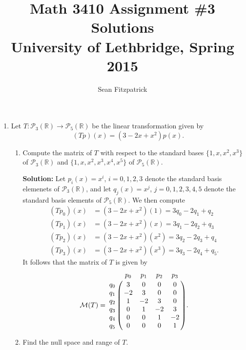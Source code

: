 \documentclass[letterpaper,12pt]{article}
\title{Math 3410 Assignment \#3 Solutions\\University of Lethbridge, Spring 2015}
\author{Sean Fitzpatrick}
\newcommand{\R}{\mathbb{R}}
\renewcommand{\P}{\mathcal{P}}
\newcommand{\M}{\mathcal{M}}
\begin{document}
 \maketitle

\begin{enumerate}
 \item Let $T:\P_3(\R)\to\P_5(\R)$ be the linear transformation given by
\[
 (Tp)(x) = (3-2x+x^2)p(x).
\]
\begin{enumerate}
 \item Compute the matrix of $T$ with respect to the standard bases $\{1,x,x^2,x^3\}$ of $\P_3(\R)$ and $\{1,x,x^2,x^3,x^4,x^5\}$ of $\P_5(\R)$.

\bigskip

{\bf Solution:} Let $p_i(x)=x^i$, $i=0,1,2,3$ denote the standard basis elemenets of $\P_3(\R)$, and let $q_j(x)=x^j$, $j=0,1,2,3,4,5$ denote the standard basis elements of $\P_5(\R)$. We then compute
\begin{align*}
 (Tp_0)(x) &= (3-2x+x^2)(1) = 3q_0-2q_1+q_2\\
 (Tp_1)(x) &= (3-2x+x^2)(x) = 3q_1-2q_2+q_3\\
 (Tp_2)(x) &= (3-2x+x^2)(x^2) = 3q_2-2q_3+q_4\\
 (Tp_3)(x) &= (3-2x+x^2)(x^3) = 3q_3-2q_4+q_5.
\end{align*}
It follows that the matrix of $T$ is given by
\[
 \M(T) = \bordermatrix{
 & p_0 & p_1 & p_2 & p_3\cr
q_0 & 3 & 0 & 0 & 0\cr
q_1 & -2 & 3 & 0 & 0\cr
q_2 & 1 & -2 & 3 & 0\cr
q_3 & 0 & 1 & -2 & 3\cr
q_4 & 0 & 0 & 1 & -2\cr
q_5 & 0 & 0 & 0 & 1
}.
\]

\bigskip

 \item Find the null space and range of $T$.

\bigskip


\end{enumerate}
\end{enumerate}
\end{document}
